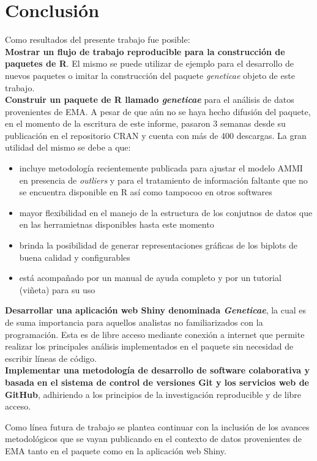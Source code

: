 \chapter{Conclusión}

Como resultados del presente trabajo fue posible:\\

\textbf{Mostrar un flujo de trabajo reproducible para la construcción de paquetes de R}. El mismo se puede utilizar de ejemplo para el desarrollo de nuevos paquetes o imitar la construcción del paquete \emph{geneticae} objeto de este trabajo. \\

\textbf{Construir un paquete de R llamado \emph{geneticae}} para el análisis de datos provenientes de EMA. A pesar de que aún no se haya hecho difusión del paquete, en el momento de la escritura de este informe, pasaron 3 semanas desde su publicación en el repositorio CRAN y cuenta con más de 400 descargas. La gran utilidad del mismo se debe a que:

\begin{itemize}
\item incluye metodología recientemente publicada para ajustar el modelo AMMI en presencia de \emph{outliers} y para el tratamiento de información faltante que no se encuentra disponible en R así como tampocoo en otros softwares

\item mayor flexibilidad en el manejo de la estructura de los conjutnos de datos que en las herramietnas disponibles hasta este momento

\item brinda la posibilidad de generar representaciones gráficas de los biplots de buena calidad y configurables

\item está acompañado por un manual de ayuda completo y por un tutorial (viñeta) para su uso
\end{itemize}


\textbf{Desarrollar una aplicación web Shiny denominada \emph{Geneticae}}, la cual es de suma importancia para aquellos analistas no familiarizados con la programación. Esta es de libre acceso mediante conexión a internet que permite realizar los principales análisis implementados en el paquete sin necesidad de escribir líneas de código. \\

\textbf{Implementar una metodología de desarrollo de software colaborativa y basada en el sistema de control de versiones Git y los servicios web de GitHub}, adhiriendo a los principios de la investigación reproducible y de libre acceso.

Como línea futura de trabajo se plantea continuar con la inclusión de los avances metodológicos que se vayan publicando en el contexto de datos provenientes de EMA tanto en el paquete como en la aplicación web Shiny. 




